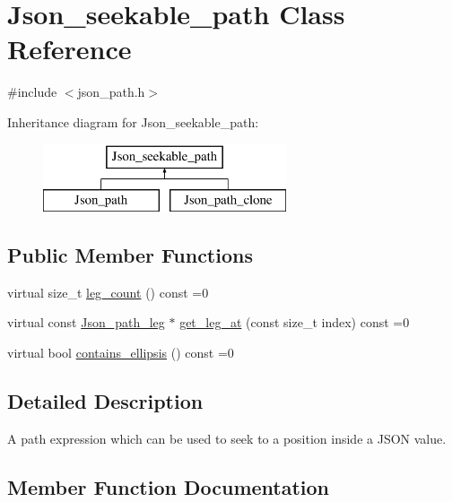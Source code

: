 \hypertarget{classJson__seekable__path}{}\section{Json\+\_\+seekable\+\_\+path Class Reference}
\label{classJson__seekable__path}


{\ttfamily \#include $<$json\+\_\+path.\+h$>$}

Inheritance diagram for Json\+\_\+seekable\+\_\+path\+:\begin{figure}[H]
\begin{center}
\leavevmode
\includegraphics[height=2.000000cm]{classJson__seekable__path}
\end{center}
\end{figure}
\subsection*{Public Member Functions}
\begin{DoxyCompactItemize}
\item 
virtual size\+\_\+t \mbox{\hyperlink{classJson__seekable__path_aa268c1af2eec01b70924509a23b8db59}{leg\+\_\+count}} () const =0
\item 
virtual const \mbox{\hyperlink{classJson__path__leg}{Json\+\_\+path\+\_\+leg}} $\ast$ \mbox{\hyperlink{classJson__seekable__path_a590e675762b99402555d555fb99ffa4f}{get\+\_\+leg\+\_\+at}} (const size\+\_\+t index) const =0
\item 
virtual bool \mbox{\hyperlink{classJson__seekable__path_a3c853224d800bf230962d9521fe466d9}{contains\+\_\+ellipsis}} () const =0
\end{DoxyCompactItemize}


\subsection{Detailed Description}
A path expression which can be used to seek to a position inside a J\+S\+ON value. 

\subsection{Member Function Documentation}
\mbox{\label{classJson__seekable__path_a3c853224d800bf230962d9521fe466d9}} 
